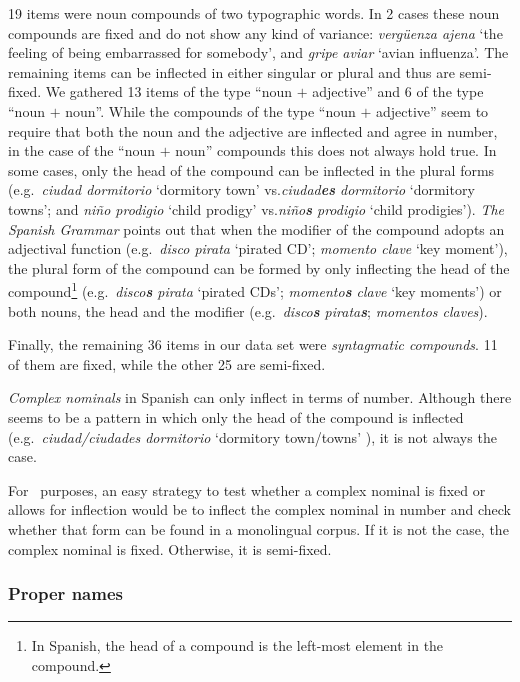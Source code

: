 \documentclass[output=paper]{langsci/langscibook}
\begin{document}
19 items were noun compounds of two typographic words.
In 2 cases these noun compounds are fixed and do not show any kind of variance: \textit{vergüenza ajena} `the feeling of being embarrassed for somebody', and \textit{gripe aviar} `avian influenza'.
The remaining items can be inflected in either singular or plural and thus are semi-fixed.
We gathered 13 items of the type ``noun $+$ adjective'' and 6 of the type ``noun $+$ noun''.
While the compounds of the type ``noun $+$ adjective'' seem to require that both the noun and the adjective are inflected and agree in number, in the case of the ``noun $+$ noun'' compounds this does not always hold true.
In some cases, only the head of the compound can be inflected in the plural forms (e.g.\  \textit{ciudad dormitorio} `dormitory town' vs.\@ \textit{ciudad\textbf{es} dormitorio} `dormitory towns'; and \textit{niño prodigio} `child prodigy' vs.\@ \textit{niño\textbf{s} prodigio} `child prodigies').
\textit{The Spanish Grammar} \citeyearpar{RAE:2010} points out that when the modifier of the compound adopts an adjectival function (e.g.\ \textit{disco pirata} `pirated CD'; \textit{momento clave} `key moment'), the plural form of the compound can be formed by only inflecting the head of the compound\footnote{In Spanish, the head of a compound is the left-most element in the compound.} (e.g.\ \textit{disco\textbf{s} pirata} `pirated CDs'; \textit{momento\textbf{s} clave} `key moments') or both nouns, the head and the modifier (e.g.\ \textit{disco\textbf{s} pirata\textbf{s}}; \textit{momentos claves}).

Finally, the remaining 36 items in our data set were \textit{syntagmatic compounds}.
11 of them are fixed, while the other 25 are semi-fixed. 

\textit{Complex nominals} in Spanish can only inflect in terms of number.
Although there seems to be a pattern in which only the head of the compound is inflected (e.g.\  \textit{ciudad/ciudades dormitorio} `dormitory town/towns' ), it is not always the case.

\newpage 
For \nlp\ purposes, an easy strategy to test whether a complex nominal is fixed or allows for inflection would be to inflect the complex nominal in number and check whether that form can be found in a monolingual corpus.
If it is not the case, the complex nominal is fixed.
Otherwise, it is semi-fixed.

\subsubsection{Proper names}
\label{ssssec:properNames}
\end{document}

